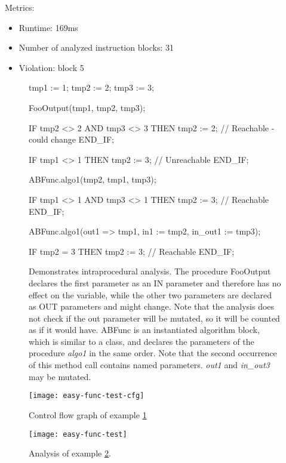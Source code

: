 Metrics:
\begin{itemize}
	\item Runtime: 169ms
	\item Number of analyzed instruction blocks: 31
	\item Violation: block 5
\end{itemize}


\begin{figure}[h!]
	\begin{GenericCode}
	tmp1 := 1;
	tmp2 := 2;
	tmp3 := 3;

	FooOutput(tmp1, tmp2, tmp3);

	IF tmp2 <> 2 AND tmp3 <> 3 THEN
		tmp2 := 2; // Reachable - could change
	END_IF;

	IF tmp1 <> 1 THEN
		tmp2 := 3; // Unreachable
	END_IF;

	ABFunc.algo1(tmp2, tmp1, tmp3);

	IF tmp1 <> 1 AND tmp3 <> 1 THEN
		tmp2 := 3; // Reachable
	END_IF;

	ABFunc.algo1(out1 => tmp1, in1 := tmp2, in_out1 := tmp3);

	IF tmp2 = 3 THEN
		tmp2 := 3; // Reachable
	END_IF;	\end{GenericCode}
	\centering
	\caption{Demonstrates intraprocedural analysis. The procedure  FooOutput declares the first parameter as an IN parameter and therefore has no effect on the variable, while the other two parameters are declared as OUT parameters and might change. Note that the analysis does not check if the out parameter will be mutated, so it will be counted as if it would have. ABFunc is an instantiated algorithm block, which is similar to a class, and declares the parameters of the procedure \emph{algo1} in the same order. Note that the second occurrence of this method call contains named parameters. \emph{out1} and \emph{in\_out3} may be mutated.}
	\label{code:func test 1}
\end{figure}
\begin{figure}[h!]
	\centering
	\texttt{[image: easy-func-test-cfg]}
	\caption{Control flow graph of example \ref{code:func test 1}}
	\label{fig:func test 1 cfg}
\end{figure}
\begin{figure}[h!]
	\centering
	\texttt{[image: easy-func-test]}
	\caption{Analysis of example \ref{fig:func test 1 cfg}.}
	\label{fig:func test 1}
\end{figure}

